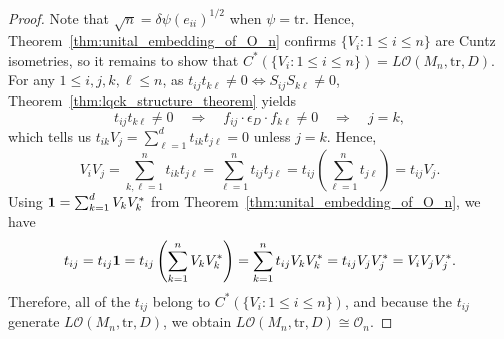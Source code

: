 \documentclass[10pt,a4paper]{amsart}
\newcommand\cO{{\mathcal O}}
\newcommand{\tr}{\text{tr}} %
\begin{document}
\begin{proof}
Note that $\sqrt{n} = \delta \psi(e_{ii})^{1/2}$ when $\psi=\tr$. Hence, Theorem~\ref{thm:unital_embedding_of_O_n} confirms $\{V_i:1\leq i \leq n\}$ are Cuntz isometries, so it remains to show that $C^*(\{V_i:1\leq i \leq n\})=L\cO(M_n,\tr,D).$ For any $1\leq i,j,k,\ell\leq n$, as $t_{ij}t_{k\ell}\neq 0\iff 
S_{ij}S_{k\ell} \neq 0$, Theorem~\ref{thm:lqck_structure_theorem} yields
\[
t_{ij}t_{k\ell}\neq 0 
\quad
\Longrightarrow 
\quad
f_{ij}\cdot \epsilon_D \cdot f_{k\ell}\neq 0 
\quad
{\Longrightarrow}
\quad
j=k,
\]
which tells us $t_{ik}V_j = \sum_{\ell=1}^d t_{ik}t_{j\ell} = 0$ unless $j=k.$ Hence,
\[V_iV_j
=\sum_{k,\ell=1}^n t_{ik}t_{j\ell}
=\sum_{\ell=1}^n t_{ij}t_{j\ell}
=t_{ij}\left(\sum_{\ell=1}^n t_{j\ell}\right)
=t_{ij}V_j.
\]
Using 
$
{\bf 1}
=
\sum_{k=1}^d V_kV_k^*
$
from Theorem~\ref{thm:unital_embedding_of_O_n}, we have
\[
    t_{ij}
    =t_{ij}{\bf 1}
    =t_{ij}\left(\sum_{k=1}^nV_kV_k^*\right)
    =\sum_{k=1}^n t_{ij}V_kV_k^*
    =t_{ij}V_jV_j^*
    =V_iV_jV_j^*.
\] 
Therefore, all of the $t_{ij}$ belong to $C^*(\{V_i:1\leq i\leq n\})$, and because the $t_{ij}$ generate $L\cO(M_n,\tr,D)$, we obtain
$L\cO(M_n,\tr,D)
\cong \cO_n$.%
\end{proof}
\end{document}
